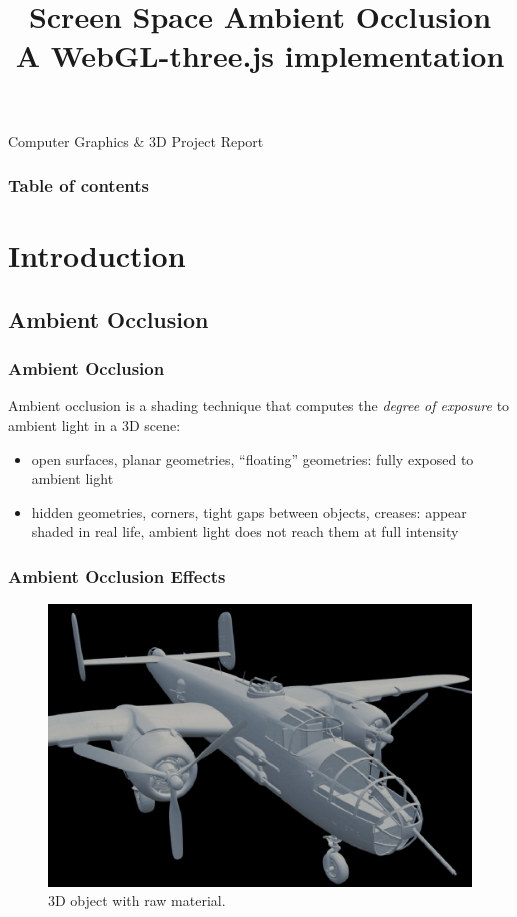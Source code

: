 \documentclass{beamer}
\title[]{Screen Space Ambient Occlusion \\\small A WebGL-three.js implementation}
\author[Ivan Prosperi]{
    \texorpdfstring{\usebox{\authbox}}{Ivan Prosperi}}
\institute[]{Universit\`a degli Studi di Firenze}
\date{}
\newcommand{\redtext}[1]{\textcolor{myred}{#1}}
\begin{document}
\newcommand{\glslvar}[1]{\texttt{#1}}

\begin{frame}
    \titlepage
    \centering
    Computer Graphics \& 3D Project Report
\end{frame}

\begin{frame}
    \frametitle{Table of contents}
    \tableofcontents[subsubsectionstyle=hide]
\end{frame}

\section{Introduction}

\subsection{Ambient Occlusion}

\begin{frame}
\frametitle{Ambient Occlusion}
Ambient occlusion is a shading technique that computes the \emph{degree of exposure} to ambient light in a 3D scene:
\begin{itemize}
    \item \redtext{open surfaces}, planar geometries, ``floating'' geometries: fully exposed to ambient light
    \item \redtext{hidden geometries}, corners, tight gaps between objects, creases: appear shaded in real life, ambient light does not reach them at full intensity
\end{itemize}

\end{frame}

\begin{frame}
\frametitle{Ambient Occlusion Effects}
\begin{figure}
    \centering
    \includegraphics[width=0.8\linewidth]{images/B-25_raw.png}
    \caption{3D object with raw material.\footnotemark}
\end{figure}

\vspace*{-8px}
\end{frame}
\end{document}
